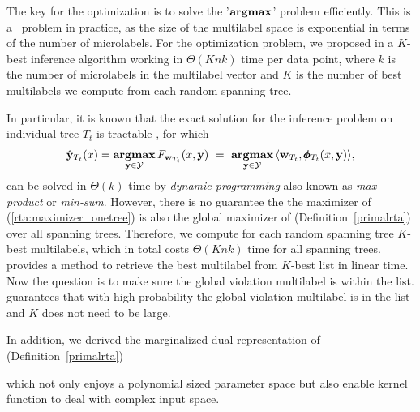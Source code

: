 {The key for the optimization is to solve the '$\textbf{argmax}$' problem efficiently.
This is a \nphard\ problem in practice, as the size of the multilabel space is exponential in terms of the number of microlabels.
For the optimization problem, we proposed in  a $K$-best inference algorithm working in $\Theta(Knk)$ time per data point, where $k$ is the number of microlabels in the multilabel vector and $K$ is the number of best multilabels we compute from each random spanning tree.

In particular, it is known that the exact solution for the inference problem on individual tree $T_t$ is tractable \citep{Koller09probabilistic}, for which 
\begin{align}\label{rta:maximizer_onetree}
	\hat{\mathbf {y}}_{T_t}(x) = \underset{\mathbf {y}\in\mathcal{Y}}{\textbf{argmax}}\, F_{\mathbf {w}_{T_t}}(x,\mathbf {y})\ =\ \underset{\mathbf {y}\in\mathcal{Y}}{\textbf{argmax}}\, \langle \mathbf {w}_{T_t}, \pmb \phi_{T_t}(x,\mathbf {y})\rangle,
\end{align}
can be solved in $\Theta(k)$ time by \textit{dynamic programming} also known as \textit{max-product} or \textit{min-sum}.
However, there is no guarantee the the maximizer of (\ref{rta:maximizer_onetree}) is also the global maximizer of (Definition~\ref{primalrta}) over all spanning trees.
Therefore, we compute for each random spanning tree $K$-best multilabels, which in total costs $\Theta(Knk)$ time for all spanning trees.
 provides a method to retrieve the best multilabel from $K$-best list in linear time.
Now the question is to make sure the global violation multilabel is within the list.
 guarantees that with high probability the global violation multilabel is in the list and $K$ does not need to be large.

In addition, we derived the marginalized dual representation of (Definition~\ref{primalrta})
\iffalse
\begin{definition}{\bf $L_2$-norm RTA Marginalized Dual.}
	\begin{align*}
		\underset{\vmu\in\Mcal^m}{\maximize} &\quad \frac{1}{|E_\Tcal|}\sum_{e,k,\vu_e}\mu(k,e,\vu_e)   -\frac{1}{2}\sum_{\substack{e,k,\vu_e,\\k',\vu_e'}} \mu(k,e,\vu_e) K_\Tcal^e(x_k,\vu_e;x_k',\vu'_e) \mu(k',e,\vu'_e)\, ,
	\end{align*}
\end{definition}
\fi
which not only enjoys a polynomial sized parameter space but also enable kernel function to deal with complex input space.





}
